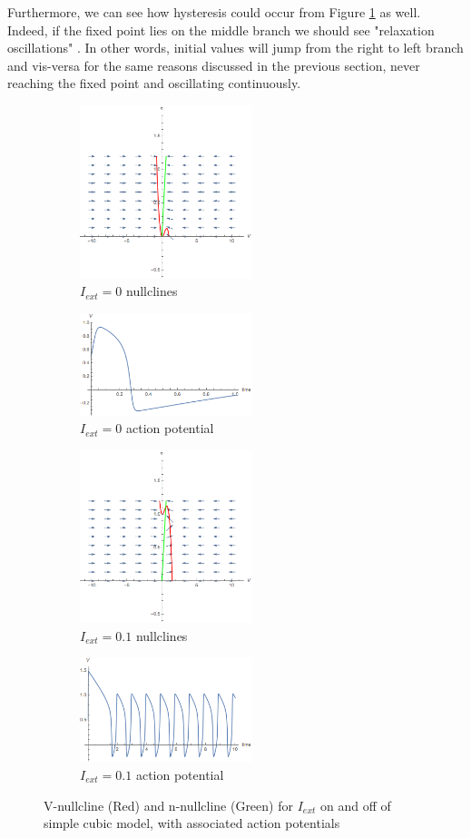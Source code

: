 \documentclass{article}
\begin{document}
Furthermore, we can see how hysteresis could occur from Figure \ref{fig:nullc_nag} as well. Indeed, if the fixed point lies on the middle branch we should see "relaxation oscillations" \cite{strog}. In other words, initial values will jump from the right to left branch and vis-versa for the same reasons discussed in the previous section, never reaching the fixed point and oscillating continuously. 

\begin{figure}
\centering
\begin{subfigure}{.5\textwidth}
	\centering
	\includegraphics[width=5cm]{nullc_naguro.png}
	\caption{$I_{ext}=0$ nullclines}
\end{subfigure}%
\begin{subfigure}{.5\textwidth}
	\centering
	\includegraphics[width=5cm]{nagumo_ap.png}
	\caption{$I_{ext}=0$ action potential}
\end{subfigure}
\begin{subfigure}{.5\textwidth}
	\centering
	\includegraphics[width=5cm]{sustained_nagumo_nullc.png}
	\caption{$I_{ext}=0.1$ nullclines}
\end{subfigure}%
\begin{subfigure}{.5\textwidth}
	\centering
	\includegraphics[width=5cm]{sustained_nagumo.png}
	\caption{$I_{ext}=0.1$ action potential}
\end{subfigure}
	\caption{V-nullcline (Red) and n-nullcline (Green) for $I_{ext}$ on and off of simple cubic model, with associated action potentials}
	\label{fig:nullc_nag}
\end{figure}
\end{document}
